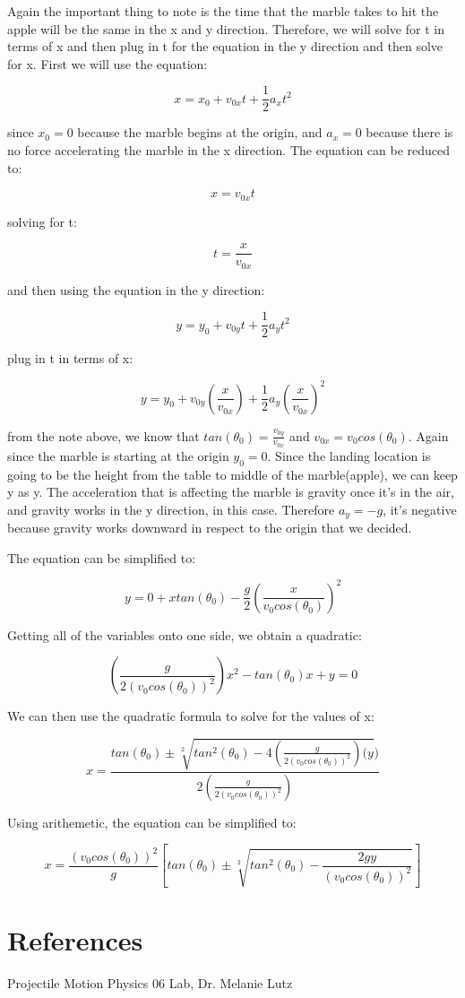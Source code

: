 \documentclass[aps,letterpaper,11pt]{revtex4}
\begin{document}
Again the important thing to note is the time that the marble takes to hit the apple will be the same in the x and y direction. Therefore, we will solve for t in terms of x and then plug in t for the equation in the y direction and then solve for x. First we will use the equation:

\[ x = x_0+v_{0x}t+\frac{1}{2}a_xt^2\]

since $x_0=0$ because the marble begins at the origin, and $a_x=0$ because there is no force accelerating the marble in the x direction. The equation can be reduced to:

$$ x=v_{0x}t$$

solving for t:

$$ t=\frac{x}{v_{0x}}$$

and then using the equation in the y direction:

\[ y = y_0+v_{0y}t+\frac{1}{2}a_yt^2\]

plug in t in terms of x:

\[ y = y_0+v_{0y}(\frac{x}{v_{0x}})+\frac{1}{2}a_y(\frac{x}{v_{0x}})^2\]

from the note above, we know that $tan(\theta_0) = \frac{v_{0y}}{v_{0x}}$ and $v_{0x}=v_0cos(\theta_0)$. Again since the marble is starting at the origin $y_0=0$. Since the landing location is going to be the height from the table to middle of the marble(apple), we can keep y as y. The acceleration that is affecting the marble is gravity once it's in the air, and gravity works in the y direction, in this case. Therefore $a_y=-g$, it's negative because gravity works downward in respect to the origin that we decided. 

The equation can be simplified to:

\[ y=0+xtan(\theta_0)-\frac{g}{2}(\frac{x}{v_0cos(\theta_0)})^2\]

Getting all of the variables onto one side, we obtain a quadratic:

\[ (\frac{g}{2(v_0cos(\theta_0))^2})x^2-tan(\theta_0)x+y=0\]

We can then use the quadratic formula to solve for the values of x:

\[ x=\frac{tan(\theta_0)\pm\sqrt[2]{tan^2(\theta_0)-4(\frac{g}{2(v_0cos(\theta_0))^2})(y})}{2(\frac{g}{2(v_0cos(\theta_0))^2})}\]

Using arithemetic, the equation can be simplified to:

\[ \boxed{x=\frac{(v_0cos(\theta_0))^2}{g}[tan(\theta_0)\pm\sqrt[2]{tan^2(\theta_0)-\frac{2gy}{(v_0cos(\theta_0))^2}}]}\]


\section{References}

\hspace{-6.5mm}
Projectile Motion Physics 06 Lab, Dr. Melanie Lutz\\
\end{document}
